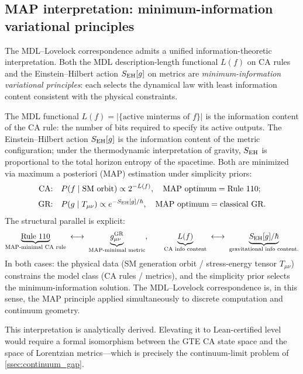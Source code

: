 \documentclass[11pt]{article}
\theoremstyle{remark}
\begin{document}
\subsection{MAP interpretation: minimum-information variational principles}
\label{ssec:map_jacobson}

The MDL--Lovelock correspondence admits a unified information-theoretic
interpretation.
Both the MDL description-length functional $L(f)$ on CA rules and the
Einstein--Hilbert action $S_{\rm EH}[g]$ on metrics are
\emph{minimum-information variational principles}:
each selects the dynamical law with least information content consistent
with the physical constraints.

The MDL functional $L(f) = |\{\text{active minterms of }f\}|$ is the
information content of the CA rule: the number of bits required to specify
its active outputs.
The Einstein--Hilbert action $S_{\rm EH}[g]$ is the information content
of the metric configuration; under the thermodynamic interpretation of
gravity, $S_{\rm EH}$ is proportional to the total horizon entropy of
the spacetime.
Both are minimized via maximum a posteriori (MAP) estimation under
simplicity priors:
\begin{align}
  \text{CA:} \quad &
    P(f \mid \text{SM orbit}) \propto 2^{-L(f)}, \quad
    \text{MAP optimum} = \text{Rule~110}; \label{eq:map_ca} \\[2pt]
  \text{GR:} \quad &
    P(g \mid T_{\mu\nu}) \propto e^{-S_{\rm EH}[g]/\hbar}, \quad
    \text{MAP optimum} = \text{classical GR.} \label{eq:map_gr}
\end{align}
The structural parallel is explicit:
\begin{equation}
  \underbrace{\text{Rule~110}}_{\text{MAP-minimal CA rule}}
  \;\longleftrightarrow\;
  \underbrace{g_{\mu\nu}^{\rm GR}}_{\text{MAP-minimal metric}},
  \qquad
  \underbrace{L(f)}_{\text{CA info content}}
  \;\longleftrightarrow\;
  \underbrace{S_{\rm EH}[g]/\hbar}_{\text{gravitational info content.}}
  \label{eq:map_parallel}
\end{equation}
In both cases: the physical data (SM generation orbit / stress-energy tensor
$T_{\mu\nu}$) constrains the model class (CA rules / metrics), and the
simplicity prior selects the minimum-information solution.
The MDL--Lovelock correspondence is, in this sense, the MAP principle
applied simultaneously to discrete computation and continuum geometry.

This interpretation is analytically derived.
Elevating it to Lean-certified level would require a formal isomorphism between the
GTE CA state space and the space of Lorentzian metrics---which is precisely
the continuum-limit problem of \cref{ssec:continuum_gap}.
\end{document}
